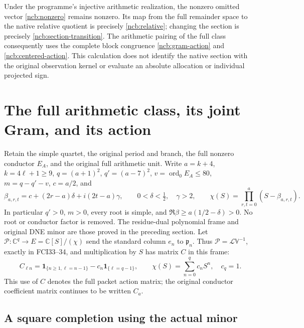 \documentclass[11pt,a4paper]{article}
\begin{document}
Under the programme's injective arithmetic realization, the nonzero
omitted vector \eqref{ncb:nonzero} remains nonzero. Its map from the
full remainder space to the native relative quotient is precisely
\eqref{ncb:relative}; changing the section is precisely
\eqref{ncb:section-transition}. The arithmetic pairing of the full
class consequently uses the complete block congruence
\eqref{ncb:gram-action} and \eqref{ncb:centered-action}.
This calculation does not identify the native section with the
original observation kernel or evaluate an absolute allocation or
individual projected sign.


\section{The full arithmetic class, its joint Gram, and its action}

Retain the simple quartet, the original period and branch, the full
nonzero conductor $E_A$, and the original full arithmetic unit.
Write $a=k+4$, $k=4\ell+1\ge9$,
$q=(a+1)^2$, $q'=(a-7)^2$, $v=\operatorname{ord}_0E_A\le80$,
$m=q-q'-v$, $c=a/2$, and
\[
 \beta_{a,r,t}=c+(2r-a)\delta+i(2t-a)\gamma,\qquad
 0<\delta<\tfrac12,\quad \gamma>2,\qquad
 \chi(S)=\prod_{r,t=0}^{a}(S-\beta_{a,r,t}).
 \tag{NCRP1}
\]
In particular $q'>0$, $m>0$, every root is simple, and
$\Re\beta\ge a(1/2-\delta)>0$. No root or conductor factor is
removed. The residue-dual polynomial frame and original DNE minor
are those proved in the preceding section. Let
$\mathscr P:\mathbb C^q\to E=\mathbb C[S]/(\chi)$ send the standard
column $e_n$ to $\mathfrak p_n$.
Thus $\mathscr P=\mathcal L\mathbb V^{-1}$, exactly in FCI33--34,
and multiplication by $S$ has matrix $C$ in this frame:
\[
 C_{\ell n}=\mathbf1_{\{n\ge1,\ell=n-1\}}
              -c_n\mathbf1_{\{\ell=q-1\}},\qquad
 \chi(S)=\sum_{n=0}^{q}c_nS^n,\quad c_q=1.
 \tag{NCRP2}
\]
This use of $C$ denotes the full packet action matrix; the original
conductor coefficient matrix continues to be written $C_a$.

\subsection{A square completion using the actual minor}
\end{document}
